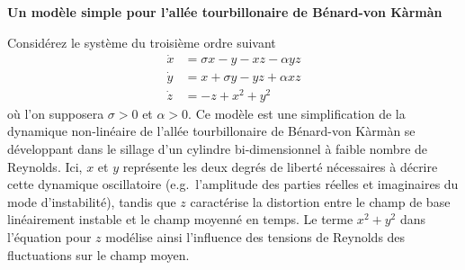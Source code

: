 \documentclass[12pt, answers]{exam}
\begin{document}
\begin{questions}
  \addpoints

  \bigskip
  
  \question[10] \textbf{Un modèle simple pour l'allée tourbillonaire de Bénard-von Kàrmàn}
  \noaddpoints

  Considérez le système du troisième ordre suivant
  \[
  \begin{aligned}
    \dot{x} & = \sigma x - y - xz - \alpha yz \\
    \dot{y} & = x + \sigma y - yz + \alpha xz \\
    \dot{z} & = -z + x^2 + y^2
  \end{aligned}
  \]
  où l'on supposera $\sigma > 0$ et $\alpha > 0$.
  Ce modèle est une simplification de la dynamique non-linéaire de l'allée tourbillonaire de Bénard-von Kàrmàn se développant dans le sillage d'un cylindre bi-dimensionnel à faible nombre de Reynolds.
  Ici, $x$ et $y$ représente les deux degrés de liberté nécessaires à décrire cette dynamique oscillatoire (e.g.\ l'amplitude des parties réelles et imaginaires du mode d'instabilité), tandis que $z$ caractérise la distortion entre le champ de base linéairement instable et le champ moyenné en temps.
  Le terme $x^2 + y^2$ dans l'équation pour $z$ modélise ainsi l'influence des tensions de Reynolds des fluctuations sur le champ moyen.

\end{questions}
\end{document}
